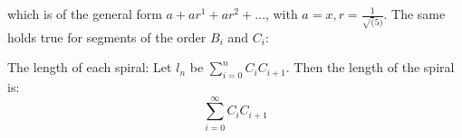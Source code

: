 \noindent
which is of the general form $a + ar^1 + ar^2 + \ldots$, with $a = x, r = \frac{1}{\sqrt(5)}$. The same holds true for segments of the order $B_{i}$ and $C_{i}$:


\noindent
The length of each spiral:
Let $l_n$ be $\sum_{i = 0}^{n} C_iC_{i+1}$. Then the length of the spiral is:
\begin{equation}
    \sum_{i = 0}^{\infty} C_iC_{i+1}
\end{equation}
